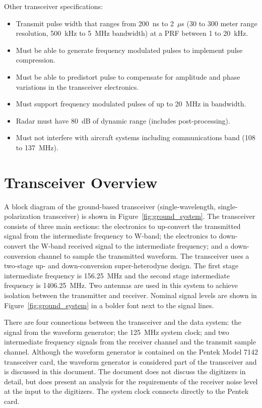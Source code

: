 \documentclass[12pt,letterpaper]{article}
\begin{document}
Other transceiver specifications:
\begin{itemize}
\item Transmit pulse width that ranges from 200~ns to 2~$\mu$s (30 to
  300 meter range resolution, 500~kHz to 5~MHz bandwidth) at a PRF
  between 1 to 20~kHz.
\item Must be able to generate frequency modulated pulses to implement
  pulse compression.
\item Must be able to predistort pulse to compensate for amplitude and
  phase variations in the transceiver electronics.
\item Must support frequency modulated pulses of up to 20~MHz in
  bandwidth.
\item Radar must have 80~dB of dynamic range (includes
  post-processing).
\item Must not interfere with aircraft systems including
  communications band (108 to 137~MHz).
\end{itemize}

\section{Transceiver Overview}
\label{sec:overview}

A block diagram of the ground-based transceiver (single-wavelength,
single-polarization transceiver) is shown in
Figure~\ref{fig:ground_system}. The transceiver consists of three main
sections: the electronics to up-convert the transmitted signal from
the intermediate frequency to W-band; the electronics to down-convert
the W-band received signal to the intermediate frequency; and a
down-conversion channel to sample the transmitted waveform. The
transceiver uses a two-stage up- and down-conversion super-heterodyne
design. The first stage intermediate frequency is 156.25~MHz and the
second stage intermediate frequency is 1406.25~MHz. Two antennas are
used in this system to achieve isolation between the transmitter and
receiver. Nominal signal levels are shown in
Figure~\ref{fig:ground_system} in a bolder font next to the signal
lines.

There are four connections between the transceiver and the data
system: the signal from the waveform generator; the 125~MHz system
clock; and two intermediate frequency signals from the receiver
channel and the transmit sample channel. Although the waveform
generator is contained on the Pentek Model 7142 transceiver card, the
waveform generator is considered part of the transceiver and is
discussed in this document. The document does not discuss the
digitizers in detail, but does present an analysis for the
requirements of the receiver noise level at the input to the
digitizers. The system clock connects directly to the Pentek card.
\end{document}
